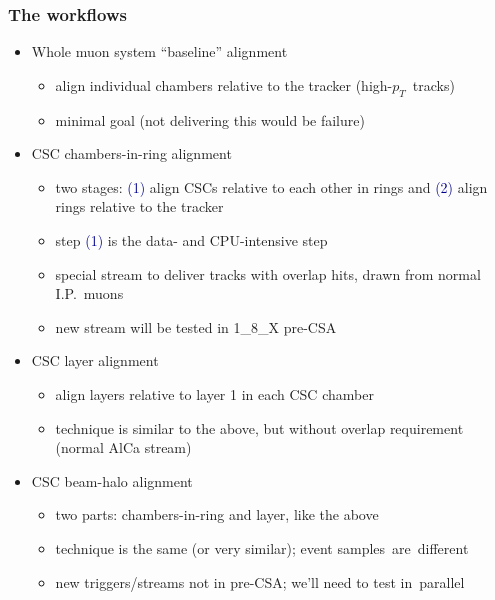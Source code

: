 \documentclass[compress]{beamer}
\begin{document}
\begin{frame}
\frametitle{The workflows}

\begin{itemize}\setlength{\itemsep}{0.1 cm}
\item Whole muon system ``baseline'' alignment
\begin{itemize}
\item align individual chambers relative to the tracker \mbox{(high-$p_T$ tracks)\hspace{-1 cm}}
\item minimal goal (not delivering this would be failure)
\end{itemize}

\item CSC chambers-in-ring alignment
\begin{itemize}
\item two stages: \textcolor{darkblue}{\scriptsize (1)} align CSCs relative to each other in rings and \textcolor{darkblue}{\scriptsize (2)} align rings relative to the tracker
\item step \textcolor{darkblue}{\scriptsize (1)} is the data- and CPU-intensive step
\item special stream to deliver tracks with overlap hits, drawn from normal I.P.\ muons
\item new stream will be tested in 1\_8\_X pre-CSA
\end{itemize}

\item CSC layer alignment
\begin{itemize}
\item align layers relative to layer 1 in each CSC chamber
\item technique is similar to the above, but without overlap requirement (normal AlCa stream)
\end{itemize}

\item CSC beam-halo alignment
\begin{itemize}
\item two parts: chambers-in-ring and layer, like the above
\item technique is the same (or very similar); event \mbox{samples are different\hspace{-1 cm}}
\item new triggers/streams not in pre-CSA; we'll need to test \mbox{in parallel\hspace{-1 cm}}
\end{itemize}
\end{itemize}
\end{frame}
\end{document}
